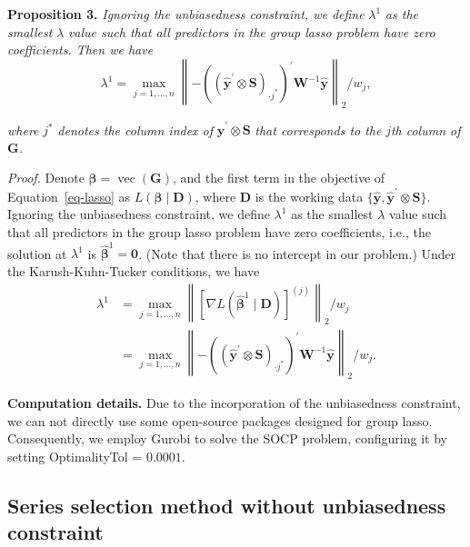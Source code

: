 \documentclass[11pt,a4paper,]{article}
\begin{document}
\textbf{Proposition 3.} \emph{Ignoring the unbiasedness constraint, we
define} \(\lambda^{1}\) \emph{as the smallest} \(\lambda\) \emph{value
such that all predictors in the group lasso problem have zero
coefficients. Then we have} \[
\lambda^{1} = \max _{j=1, \ldots, n}\left\|-\left(\left(\hat{\boldsymbol{y}}^{\prime} \otimes \boldsymbol{S}\right)_{\cdot j^{*}}\right)^{\prime} \boldsymbol{W}^{-1} \hat{\boldsymbol{y}}\right\|_2 / w_j,
\]

\emph{where} \(j^{*}\) \emph{denotes the column index of}
\(\hat{\boldsymbol{y}}^{\prime} \otimes \boldsymbol{S}\) \emph{that
corresponds to the} \(j\)\emph{th column of} \(\boldsymbol{G}\)\emph{.}

\emph{Proof.} Denote
\(\boldsymbol{\beta} = \operatorname{vec}(\boldsymbol{G})\), and the
first term in the objective of Equation~\ref{eq-lasso} as
\(L\left(\boldsymbol{\beta} \mid \boldsymbol{D}\right)\), where
\(\boldsymbol{D}\) is the working data
\(\{\hat{\boldsymbol{y}} , \hat{\boldsymbol{y}}^{\prime} \otimes \boldsymbol{S}\}\).
Ignoring the unbiasedness constraint, we define \(\lambda^{1}\) as the
smallest \(\lambda\) value such that all predictors in the group lasso
problem have zero coefficients, i.e., the solution at \(\lambda^{1}\) is
\(\hat{\boldsymbol{\beta}}^{1}=\boldsymbol{0}\). (Note that there is no
intercept in our problem.) Under the Karush-Kuhn-Tucker conditions, we
have \[
\begin{aligned}
\lambda^{1} & = \max _{j=1, \ldots, n}\left\|\left[\nabla L\left(\hat{\boldsymbol{\beta}}^{1} \mid \mathbf{D}\right)\right]^{(j)}\right\|_2 / w_j \\
& = \max _{j=1, \ldots, n}\left\|-\left(\left(\hat{\boldsymbol{y}}^{\prime} \otimes \boldsymbol{S}\right)_{\cdot j^{*}}\right)^{\prime} \boldsymbol{W}^{-1} \hat{\boldsymbol{y}}\right\|_2 / w_j.
\end{aligned}
\]

\textbf{Computation details.} Due to the incorporation of the
unbiasedness constraint, we can not directly use some open-source
packages designed for group lasso. Consequently, we employ Gurobi to
solve the SOCP problem, configuring it by setting OptimalityTol =
\(0.0001\).

\hypertarget{sec-unconstrained}{%
\subsection{Series selection method without unbiasedness
constraint}\label{sec-unconstrained}}
\end{document}
